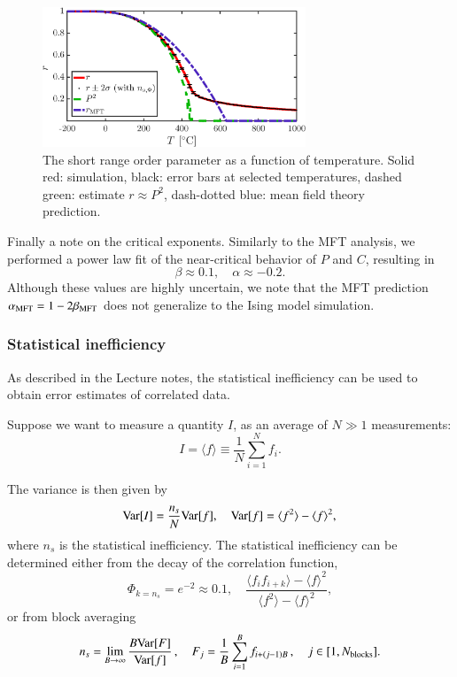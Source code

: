\begin{figure}[!ht]
\begin{center}
  \includegraphics[width=0.7\textwidth]{../figures/r} 
  \caption{The short range order parameter as a function of temperature. Solid red: simulation, black: error bars at selected temperatures, dashed green: estimate $r \approx P^2$, dash-dotted blue: mean field theory prediction. }
  \label{fig:r}
\end{center}
\end{figure}

Finally a note on the critical exponents. Similarly to the MFT analysis, we performed a power law fit of 
the near-critical behavior of $P$ and $C$, resulting in 
\begin{equation}
\beta \approx 0.1, \quad \alpha \approx -0.2.
\end{equation}
Although these values are highly uncertain, we note that the MFT prediction $\alpha_{\rm MFT} = 1-2\beta_{\rm MFT} $ does not generalize to the Ising model simulation. 

\subsubsection*{Statistical inefficiency}
\label{sec:ns}
As described in the Lecture notes, the statistical inefficiency can be used to obtain error estimates of correlated data. 

Suppose we want to measure a quantity $I$, as an average of $N\gg1$ measurements: 
\begin{equation}
I = \langle f \rangle \equiv \frac{1}{N}\sum_{i = 1}^N f_i.
\end{equation}

The variance is then given by 
\begin{equation}
{\rm Var}[I] = \frac{n_s}{N}{\rm Var}[f], \quad {\rm Var}[f] = \langle f^2 \rangle - \langle f \rangle^2,
\end{equation}
where $n_s$ is the statistical inefficiency. 
The statistical inefficiency can be determined either from the decay of the correlation function, 
\begin{equation}
\Phi_{k = n_s} = e^{-2} \approx 0.1, \quad \frac{\langle f_i f_{i+k}\rangle - \langle f \rangle^2}{\langle f^2\rangle - \langle f \rangle^2},
\label{eq:ns_Phi}
\end{equation}
or from block averaging
\begin{equation}
n_s = \lim_{B \rightarrow \infty} \frac{B {\rm Var}[F]}{{\rm Var}[f]}\,, \quad F_j = \frac{1}{B}\sum_{i = 1}^B f_{i + (j-1)B}\,, \quad j \in [1, N_{\rm blocks} ].
\label{eq:ns_block}
\end{equation}

